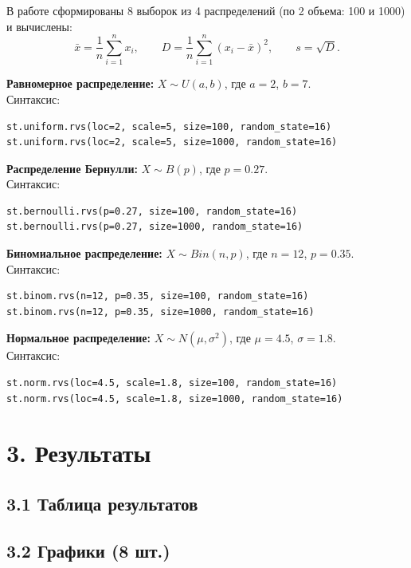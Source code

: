 \documentclass[a4paper,14pt]{extarticle}
\begin{document}
В работе сформированы 8 выборок из 4 распределений (по 2 объема: 100 и 1000) и вычислены:
\[
\bar{x}=\frac{1}{n}\sum_{i=1}^{n}x_i,\qquad
D=\frac{1}{n}\sum_{i=1}^{n}(x_i-\bar{x})^2,\qquad
s=\sqrt{D}.
\]

\textbf{Равномерное распределение:} \(X\sim U(a,b)\), где \(a=2\), \(b=7\).\\
Синтаксис:
\begin{lstlisting}[style=pycode]
st.uniform.rvs(loc=2, scale=5, size=100, random_state=16)
st.uniform.rvs(loc=2, scale=5, size=1000, random_state=16)
\end{lstlisting}

\textbf{Распределение Бернулли:} \(X\sim B(p)\), где \(p=0.27\).\\
Синтаксис:
\begin{lstlisting}[style=pycode]
st.bernoulli.rvs(p=0.27, size=100, random_state=16)
st.bernoulli.rvs(p=0.27, size=1000, random_state=16)
\end{lstlisting}

\textbf{Биномиальное распределение:} \(X\sim Bin(n,p)\), где \(n=12\), \(p=0.35\).\\
Синтаксис:
\begin{lstlisting}[style=pycode]
st.binom.rvs(n=12, p=0.35, size=100, random_state=16)
st.binom.rvs(n=12, p=0.35, size=1000, random_state=16)
\end{lstlisting}

\textbf{Нормальное распределение:} \(X\sim N(\mu,\sigma^2)\), где \(\mu=4.5\), \(\sigma=1.8\).\\
Синтаксис:
\begin{lstlisting}[style=pycode]
st.norm.rvs(loc=4.5, scale=1.8, size=100, random_state=16)
st.norm.rvs(loc=4.5, scale=1.8, size=1000, random_state=16)
\end{lstlisting}

\section*{3. Результаты}

\subsection*{3.1 Таблица результатов}


\subsection*{3.2 Графики (8 шт.)}
\end{document}
